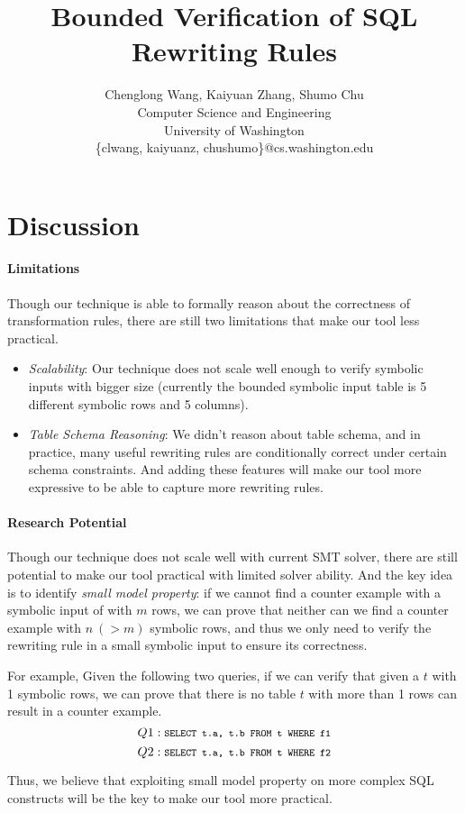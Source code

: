 \documentclass[10pt]{article}
\newcommand{\code}[1]{\texttt{\footnotesize #1}}
\begin{document}
\title{Bounded Verification of SQL Rewriting Rules}
\author{Chenglong Wang, Kaiyuan Zhang, Shumo Chu \\  
       Computer Science and Engineering\\ 
       University of Washington \\ 
       \{clwang, kaiyuanz, chushumo\}@cs.washington.edu  }
\date{}
\maketitle







\section{Discussion}
\paragraph{Limitations} Though our technique is able to formally reason about the correctness of transformation rules, there are still two limitations that make our tool less practical.
\begin{itemize}
\item \emph{Scalability}: Our technique does not scale well enough to verify symbolic inputs with bigger size (currently the bounded symbolic input table is 5 different symbolic rows and 5 columns).
\item \emph{Table Schema Reasoning}: We didn't reason about table schema, and in practice, many useful rewriting rules are conditionally correct under certain schema constraints. And adding these features will make our tool more expressive to be able to capture more rewriting rules.
\end{itemize} 

\paragraph{Research Potential} Though our technique does not scale well with current SMT solver, there are still potential to make our tool practical with limited solver ability. And the key idea is to identify \emph{small model property}: if we cannot find a counter example with a symbolic input of with $m$ rows, we can prove that neither can we find a counter example with $n~(>m)$ symbolic rows, and thus we only need to verify the rewriting rule in a small symbolic input to ensure its correctness.

For example, Given the following two queries, if we can verify that given a $t$ with 1 symbolic rows, we can prove that there is no table $t$ with more than 1 rows can result in a counter example.
$$Q1: \code{SELECT t.a, t.b FROM t WHERE f1}$$
$$Q2: \code{SELECT t.a, t.b FROM t WHERE f2}$$

Thus, we believe that exploiting small model property on more complex SQL constructs will be the key to make our tool more practical.






\end{document}

